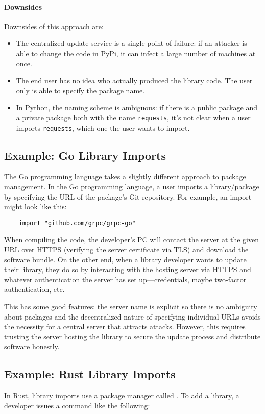\paragraph{Downsides} Downsides of this approach are:
\begin{itemize}
  \item The centralized update service is a single point of 
        failure: if an attacker is able to change the code in
        PyPi, it can infect a large number of machines at once.
  \item The end user has no idea who actually produced the library
        code. The user only is able to specify the package name.
  \item In Python, the naming scheme is ambiguous: if there is
        a public package and a private package both with the name
        \texttt{requests}, it's not clear when a user imports
        \texttt{requests}, which one the user wants to import.
\end{itemize}


\subsection{Example: Go Library Imports}
The Go programming language takes a slightly different
approach to package management.
In the Go programming language, a user
imports a library/package by 
specifying the URL of the package's 
Git repository.
For example, an import might look like this:
\begin{lstlisting}	
	import "github.com/grpc/grpc-go"
\end{lstlisting}

When compiling the code, the developer's PC will contact the server at the given URL over HTTPS (verifying the server certificate via TLS) and download the software bundle. On the other end, when a library developer wants to update their library, they do so by interacting with the hosting server via HTTPS and whatever authentication the server has set up---credentials, maybe two-factor authentication, etc.

This has some good features: the server name is explicit so there is no ambiguity about packages and the decentralized nature of specifying individual URLs avoids the necessity for a central server that attracts attacks. However, this requires trusting the server hosting the library to secure the update process and distribute software honestly.

\iffalse
\subsection{Example: Rust Library Imports}
In Rust, library imports use a package manager called . To add a library, a developer issues a command like the following:

